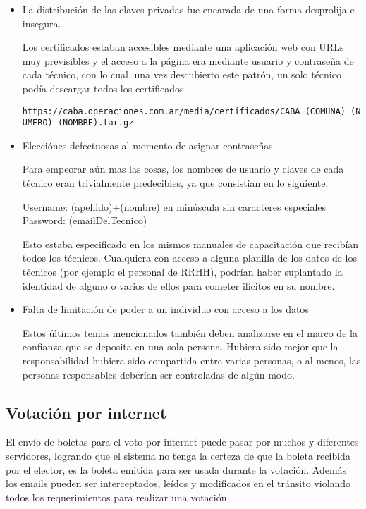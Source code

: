 \begin{itemize}
\item La distribución de las claves privadas fue encarada de una forma desprolija e insegura.

Los certificados estaban accesibles mediante una aplicación web con URLs muy previsibles y el acceso a la página era mediante usuario y contraseña de cada técnico, con lo cual, una vez descubierto este patrón, un solo técnico podía descargar todos los certificados.

\texttt{https://caba.operaciones.com.ar/media/certificados/CABA\_(COMUNA)\_(NUMERO)-(NOMBRE).tar.gz}

\item Elecciónes defectuosas al momento de asignar contraseñas

Para empeorar aún mas las cosas, los nombres de usuario y claves de cada técnico eran trivialmente predecibles, ya que consistian en lo siguiente:

Username: (apellido)+(nombre) en minúscula sin caracteres especiales\\
Password: (emailDelTecnico)

Esto estaba especificado en los mismos manuales de capacitación que recibían todos los técnicos. Cualquiera con acceso a alguna planilla de los datos de los técnicos (por ejemplo el personal de RRHH), podrían haber suplantado la identidad de alguno o varios de ellos para cometer ilícitos en su nombre.

\item Falta de limitación de poder a un individuo con acceso a los datos

Estos últimos temas mencionados también deben analizarse en el marco de la confianza que se deposita en una sola persona. Hubiera sido mejor que la responsabilidad hubiera sido compartida entre varias personas, o al menos, las personas responsables deberían ser controladas de algún modo.
\end{itemize}

\subsection{Votación por internet}
El envío de boletas para el voto por internet puede pasar por muchos y diferentes servidores, logrando que el sistema no tenga la certeza de que la boleta recibida por el elector, es la boleta emitida para ser usada durante la votación. Además los emails pueden ser interceptados, leídos y modificados en el tránsito violando todos los requerimientos para realizar una votación


